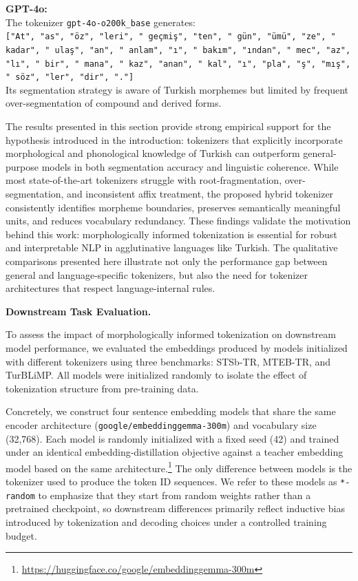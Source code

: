 \vspace{1em}

\textbf{GPT-4o:} \\
The tokenizer \texttt{gpt-4o-o200k\_base} generates: \\
\texttt{["At", "as", "öz", "leri", " geçmiş", "ten", " gün", "ümü", "ze", " kadar", " ulaş", "an", " anlam", "ı", " bakım", "ından", " mec", "az", "lı", " bir", " mana", " kaz", "anan", " kal", "ı", "pla", "ş", "mış", " söz", "ler", "dir", "."]} \\
Its segmentation strategy is aware of Turkish morphemes but limited by frequent over-segmentation of compound and derived forms.

\vspace{1em}

The results presented in this section provide strong empirical support for the hypothesis introduced in the introduction: tokenizers that explicitly incorporate morphological and phonological knowledge of Turkish can outperform general-purpose models in both segmentation accuracy and linguistic coherence. While most state-of-the-art tokenizers struggle with root-fragmentation, over-segmentation, and inconsistent affix treatment, the proposed hybrid tokenizer consistently identifies morpheme boundaries, preserves semantically meaningful units, and reduces vocabulary redundancy. These findings validate the motivation behind this work: morphologically informed tokenization is essential for robust and interpretable NLP in agglutinative languages like Turkish. The qualitative comparisons presented here illustrate not only the performance gap between general and language-specific tokenizers, but also the need for tokenizer architectures that respect language-internal rules.

\textbf{Downstream Task Evaluation.}

To assess the impact of morphologically informed tokenization on downstream model performance, we evaluated the embeddings produced by models initialized with different tokenizers using three benchmarks: STSb-TR, MTEB-TR, and TurBLiMP. All models were initialized randomly to isolate the effect of tokenization structure from pre-training data.

Concretely, we construct four sentence embedding models that share the same encoder architecture (\texttt{google/embeddinggemma-300m}) and vocabulary size (32,768). Each model is randomly initialized with a fixed seed (42) and trained under an identical embedding-distillation objective against a teacher embedding model based on the same architecture.\footnote{\url{https://huggingface.co/google/embeddinggemma-300m}} The only difference between models is the tokenizer used to produce the token ID sequences. We refer to these models as \texttt{*-random} to emphasize that they start from random weights rather than a pretrained checkpoint, so downstream differences primarily reflect inductive bias introduced by tokenization and decoding choices under a controlled training budget.


